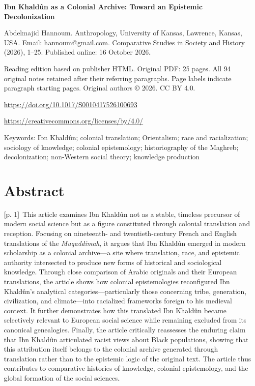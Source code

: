 \documentclass[10pt,a4paper]{article}
\begin{document}
{\Large\bfseries Ibn Khaldûn as a Colonial Archive: Toward an Epistemic Decolonization\par}\medskip

Abdelmajid Hannoum. Anthropology, University of Kansas, Lawrence, Kansas, USA. Email: hannoum@gmail.com. Comparative Studies in Society and History (2026), 1–25. Published online: 16 October 2026.\par
Reading edition based on publisher HTML. Original PDF: 25 pages. All 94 original notes retained after their referring paragraphs. Page labels indicate paragraph starting pages. Original authors © 2026. CC BY 4.0.\par
\url{https://doi.org/10.1017/S0010417526100693}\par
\url{https://creativecommons.org/licenses/by/4.0/}\par
Keywords: Ibn Khaldûn; colonial translation; Orientalism; race and racialization; sociology of knowledge; colonial epistemology; historiography of the Maghreb; decolonization; non-Western social theory; knowledge production\par\bigskip
{}\section*{Abstract}
{\scriptsize\color{gray} [p. 1]}\ This article examines Ibn Khaldûn not as a stable, timeless precursor of modern social science but as a figure constituted through colonial translation and reception. Focusing on nineteenth- and twentieth-century French and English translations of the \textit{Muqaddimah}, it argues that Ibn Khaldûn emerged in modern scholarship as a colonial archive—a site where translation, race, and epistemic authority intersected to produce new forms of historical and sociological knowledge. Through close comparison of Arabic originals and their European translations, the article shows how colonial epistemologies reconfigured Ibn Khaldûn’s analytical categories—particularly those concerning tribe, generation, civilization, and climate—into racialized frameworks foreign to his medieval context. It further demonstrates how this translated Ibn Khaldûn became selectively relevant to European social science while remaining excluded from its canonical genealogies. Finally, the article critically reassesses the enduring claim that Ibn Khaldûn articulated racist views about Black populations, showing that this attribution itself belongs to the colonial archive generated through translation rather than to the epistemic logic of the original text. The article thus contributes to comparative histories of knowledge, colonial epistemology, and the global formation of the social sciences.\par
\end{document}
